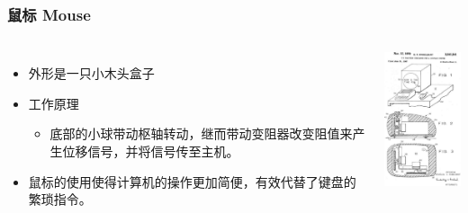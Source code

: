 \documentclass{beamer}
\begin{document}
\begin{frame}
	\frametitle{鼠标 Mouse}
	\beamertemplatetransparentcovereddynamicmedium
	\begin{columns}
		\begin{itemize}[<+->]
		\item 外形是一只小木头盒子
		\item 工作原理
		\begin{itemize}
			\item 底部的小球带动枢轴转动，继而带动变阻器改变阻值来产生位移信号，并将信号传至主机。
		\end{itemize}
		\item 鼠标的使用使得计算机的操作更加简便，有效代替了键盘的繁琐指令。
		\end{itemize}
		\includegraphics[width=3.5cm]{images/computer-mouse-original-patent.jpg}
	\end{columns}
\end{frame}
\end{document}
